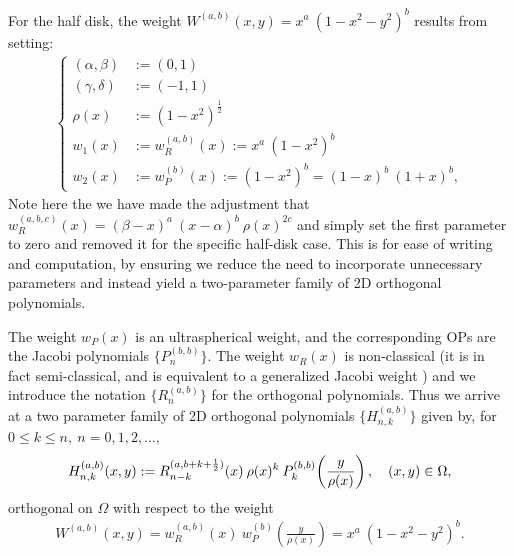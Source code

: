 \documentclass[11pt, oneside]{article}   	%
\newcommand{\half}{\frac{1}{2}}
\newcommand{\hdop}{H}
\newcommand{\hdopnk}{\hdop_{n,k}}
\newcommand{\hdopnkab}{\hdop_{n,k}^{(a,b)}}
\newcommand{\genjac}{R}
\newcommand{\genjacnmk}{\genjac_{n-k}}
\newcommand{\genjacw}{w_\genjac}
\begin{document}
For the half disk, the weight $W^{(a,b)}(x,y) = x^a \: (1-x^2-y^2)^b$ results from setting:
\begin{align*}
\begin{cases}
(\alpha,\beta) &:= (0,1) \\
(\gamma,\delta) &:= (-1,1) \\
\rho(x) &:= (1-x^2)^{\half} \\
w_1(x) &:= \genjacw^{(a,b)}(x) := x^a \: (1-x^2)^b \\
w_2(x) &:= w_P^{(b)}(x) := (1-x^2)^b = (1-x)^b \: (1+x)^b,
\end{cases}
\end{align*}
Note here the we have made the adjustment that $\genjacw^{(a,b,c)}(x) = (\beta - x)^a \: (x - \alpha)^{b} \: \rho(x)^{2c}$ and simply set the first parameter to zero and removed it for the specific half-disk case. This is for ease of writing and computation, by ensuring we reduce the need to incorporate unnecessary parameters and instead yield a two-parameter family of 2D orthogonal polynomials. 

The weight $w_P(x)$ is an ultraspherical weight, and the corresponding OPs are the Jacobi polynomials  $\{P_n^{(b, b)}\}$. The weight $w_R(x)$ is non-classical (it is in fact semi-classical, and is equivalent to a generalized Jacobi weight \cite[\S5]{magnus1995painleve}) and we introduce the notation $\{\genjac_n^{(a, b)}\}$ for the orthogonal polynomials. Thus we arrive at a two parameter family of 2D orthogonal polynomials $\{\hdopnkab\}$ given by, for $0 \le k \le n, \: n = 0,1,2,\dots,$
\begin{align}\label{eq:diskpolys}
 \hdopnk^{(a,b)}(x,y) := \genjacnmk^{(a, b+k+\half)}(x) \: \rho(x)^k \: P_k^{(b,b)}\fpr(\frac{y}{\rho(x)}), \quad (x,y) \in \Omega, 
\end{align}
orthogonal on \(\Omega\) with respect to the weight
\begin{align*}
W^{(a,b)}(x,y) = \genjacw^{(a,b)}(x) \: w_P^{(b)}(\frac{y}{\rho(x)}) = x^a \: (1-x^2-y^2)^b.
\end{align*}
\end{document}
